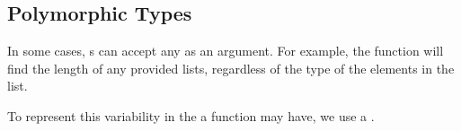 \subsection{Polymorphic Types}\label{subsec:Polymorphic_Types}
In some cases, s can accept any  as an argument.
For example, the  function will find the length of any provided lists, regardless of the type of the elements in the list.

To represent this variability in the  a function may have, we use a .


